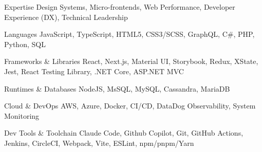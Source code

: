 

\begin{cvskills}

  \cvskill
    {Expertise} %
    {Design Systems, Micro-frontends, Web Performance, Developer Experience (DX), Technical Leadership} %

  \cvskill
    {Languages} %
    {JavaScript, TypeScript, HTML5, CSS3/SCSS, GraphQL, C\#, PHP, Python, SQL} %

  \cvskill
    {Frameworks \& Libraries} %
    {React, Next.js, Material UI, Storybook, Redux, XState, Jest, React Testing Library, .NET Core, ASP.NET MVC} %

  \cvskill
    {Runtimes \& Databases} %
    {NodeJS, MsSQL, MySQL, Cassandra, MariaDB} %

  \cvskill
    {Cloud \& DevOps} %
    {AWS, Azure, Docker, CI/CD, DataDog Observability, System Monitoring} %

  \cvskill
    {Dev Tools \& Toolchain} %
    {Claude Code, Github Copilot, Git, GitHub Actions, Jenkins, CircleCI, Webpack, Vite, ESLint, npm/pnpm/Yarn} %

\end{cvskills}